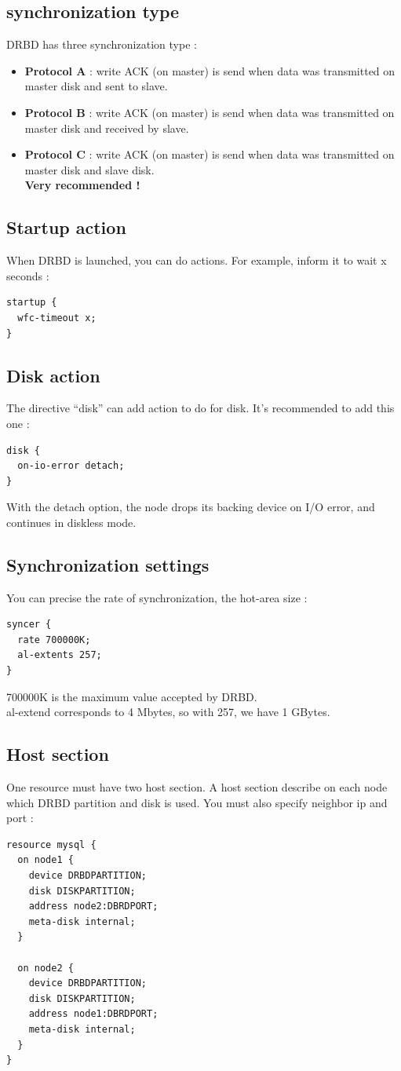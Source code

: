 \documentclass[a4paper,10pt]{report}
\begin{document}
\subsection{synchronization type}
DRBD has three synchronization type :
\begin{itemize}
\item \textbf{Protocol A} : write ACK (on master) is send when data was transmitted on master disk and sent to slave.
\item \textbf{Protocol B} : write ACK (on master) is send when data was transmitted on master disk and received by slave.
\item \textbf{Protocol C} : write ACK (on master) is send when data was transmitted on master disk and slave disk.\\
\textbf{Very recommended !}
\end{itemize}

\subsection{Startup action}
When DRBD is launched, you can do actions. For example, inform it to wait x seconds :
\begin{lstlisting}
startup {
  wfc-timeout x;
}
\end{lstlisting}

\subsection{Disk action}
The directive ``disk'' can add action to do for disk. It's recommended to add this one :
\begin{lstlisting}
disk {
  on-io-error detach;
}
\end{lstlisting}
With the detach option, the node drops its backing device on I/O error, and continues in diskless mode.

\subsection{Synchronization settings}
You can precise the rate of synchronization, the hot-area size :
\begin{lstlisting}
syncer {
  rate 700000K;
  al-extents 257;
}
\end{lstlisting}
700000K is the maximum value accepted by DRBD.\\
al-extend corresponds to 4 Mbytes, so with 257, we have 1 GBytes.

\subsection{Host section}
\label{hostsection} 
One resource must have two host section. A host section describe on each node which DRBD partition and disk is used. You must also specify neighbor ip and port :
\begin{lstlisting}
resource mysql {
  on node1 {
    device DRBDPARTITION;
    disk DISKPARTITION;
    address node2:DBRDPORT;
    meta-disk internal;
  }

  on node2 {
    device DRBDPARTITION;
    disk DISKPARTITION;
    address node1:DBRDPORT;
    meta-disk internal;
  }
}
\end{lstlisting}
\end{document}
